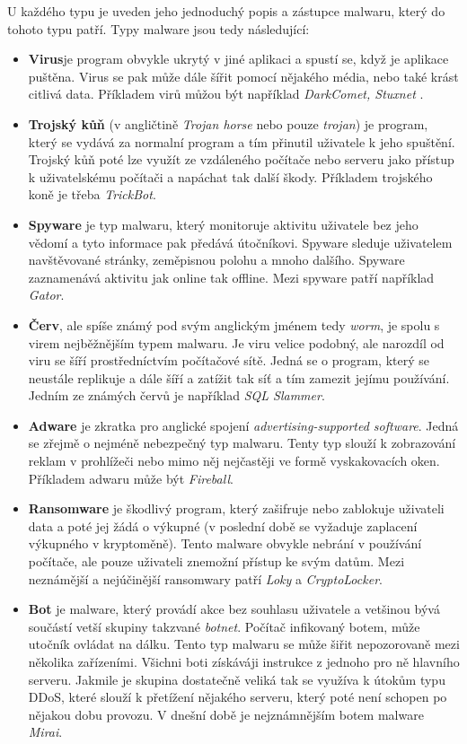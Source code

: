 U každého typu je uveden jeho jednoduchý popis a zástupce malwaru, který do tohoto typu patří. Typy malware jsou tedy následující:\cite{kaspersky,article_malware,malware_book,malware_wiki} %
\begin{itemize}
    \item \textbf{Virus}je program obvykle ukrytý v jiné aplikaci a spustí se, když je aplikace puštěna. Virus se pak může dále šířit pomocí nějakého média, nebo také krást citlivá data. Příkladem virů můžou být například \textit{DarkComet, Stuxnet} \cite{malware_types}. 
    \item \textbf{Trojský kůň} (v angličtině \textit{Trojan horse} nebo pouze \textit{trojan}) je program, který se vydává za normalní program a tím přinutil uživatele k jeho spuštění. Trojský kůň poté lze využít ze vzdáleného počítače nebo serveru jako přístup k uživatelskému počítači a napáchat tak další škody. Příkladem trojského koně je třeba \textit{TrickBot}.  
    \item \textbf{Spyware} je typ malwaru, který monitoruje aktivitu uživatele bez jeho vědomí a tyto informace pak předává útočníkovi. Spyware sleduje uživatelem navštěvované stránky, zeměpisnou polohu a mnoho dalšího. Spyware zaznamenává aktivitu jak online tak offline. Mezi spyware patří například \textit{Gator}.
    \item \textbf{Červ}, ale spíše známý pod svým anglickým jménem tedy \textit{worm}, je spolu s virem nejběžnějším typem malwaru. Je viru velice podobný, ale narozdíl od viru se šíří prostředníctvím počítačové sítě. Jedná se o program, který se neustále replikuje a dále šíří a zatížit tak síť a tím zamezit jejímu používání. Jedním ze známých červů je například \textit{SQL Slammer}. 
    \newpage
    \item \textbf{Adware} je zkratka pro anglické spojení \textit{advertising-supported software}. Jedná se zřejmě o nejméně nebezpečný typ malwaru. Tenty typ slouží k zobrazování reklam v prohlížeči nebo mimo něj nejčastěji ve formě vyskakovacích oken. Příkladem adwaru může být \textit{Fireball}.
    \item \textbf{Ransomware} je škodlivý program, který zašifruje nebo zablokuje uživateli data a poté jej žádá o výkupné (v poslední době se vyžaduje zaplacení výkupného v kryptoměně). Tento malware obvykle nebrání v používání počítače, ale pouze uživateli znemožní přístup ke svým datům. Mezi neznámější a nejúčinější ransomwary patří \textit{Loky} a \textit{CryptoLocker}.
    \item \textbf{Bot} \label{botnets} je malware, který provádí akce bez souhlasu uživatele a vetšinou bývá součástí vetší skupiny takzvané \textit{botnet}. Počítač infikovaný botem, může utočník ovládat na dálku. Tento typ malwaru se může šiřit nepozorovaně mezi několika zařízeními. Všichni boti získáváji instrukce z jednoho pro ně hlavního serveru. Jakmile je skupina dostatečně veliká tak se využíva k útokům typu DDoS, které slouží k přetížení nějakého serveru, který poté není schopen po nějakou dobu provozu. V dnešní době je nejznámnějším botem malware \textit{Mirai}.
\end{itemize}

